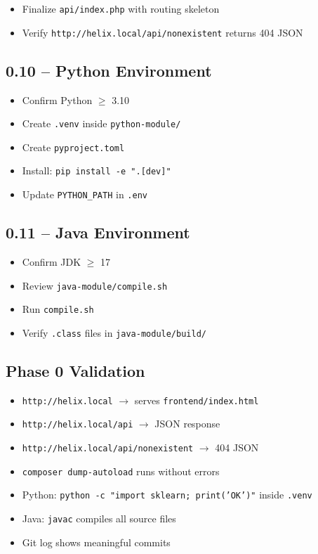 \documentclass[11pt,a4paper]{article}
\newcommand{\undone}{\textcolor{helixgray}{\texttt{[ ] }}}
\newcommand{\done}{\textcolor{helixteal}{\textbf{[x] }}}
\newcommand{\filepath}[1]{\texttt{\small#1}}
\newcommand{\task}[2]{\item[#1] #2}
\begin{document}
\begin{itemize}
    \task{\undone}{Finalize \filepath{api/index.php} with routing skeleton}
    \task{\undone}{Verify \texttt{http://helix.local/api/nonexistent} returns 404 JSON}
\end{itemize}

\subsection{0.10 -- Python Environment}

\begin{itemize}
    \task{\done}{Confirm Python $\geq$ 3.10}
    \task{\done}{Create \texttt{.venv} inside \filepath{python-module/}}
    \task{\undone}{Create \filepath{pyproject.toml}}
    \task{\undone}{Install: \texttt{pip install -e ".[dev]"}}
    \task{\undone}{Update \texttt{PYTHON\_PATH} in \filepath{.env}}
\end{itemize}

\subsection{0.11 -- Java Environment}

\begin{itemize}
    \task{\done}{Confirm JDK $\geq$ 17}
    \task{\undone}{Review \filepath{java-module/compile.sh}}
    \task{\undone}{Run \filepath{compile.sh}}
    \task{\undone}{Verify \texttt{.class} files in \filepath{java-module/build/}}
\end{itemize}

\subsection{Phase 0 Validation}

\begin{itemize}
    \task{\undone}{\texttt{http://helix.local} $\rightarrow$ serves \filepath{frontend/index.html}}
    \task{\undone}{\texttt{http://helix.local/api} $\rightarrow$ JSON response}
    \task{\undone}{\texttt{http://helix.local/api/nonexistent} $\rightarrow$ 404 JSON}
    \task{\undone}{\texttt{composer dump-autoload} runs without errors}
    \task{\undone}{Python: \texttt{python -c "import sklearn; print('OK')"} inside \texttt{.venv}}
    \task{\undone}{Java: \texttt{javac} compiles all source files}
    \task{\undone}{Git log shows meaningful commits}
\end{itemize}

\end{document}
